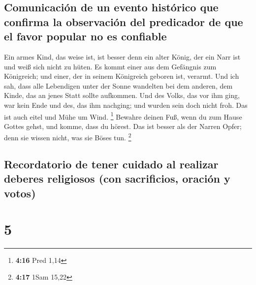 \hypertarget{comunicaciuxf3n-de-un-evento-histuxf3rico-que-confirma-la-observaciuxf3n-del-predicador-de-que-el-favor-popular-no-es-confiable}{%
\subsection{Comunicación de un evento histórico que confirma la
observación del predicador de que el favor popular no es
confiable}\label{comunicaciuxf3n-de-un-evento-histuxf3rico-que-confirma-la-observaciuxf3n-del-predicador-de-que-el-favor-popular-no-es-confiable}}

 Ein armes Kind, das weise ist, ist besser denn ein alter
König, der ein Narr ist und weiß sich nicht zu hüten.  Es
kommt einer aus dem Gefängnis zum Königreich; und einer, der in seinem
Königreich geboren ist, verarmt.  Und ich sah, dass alle
Lebendigen unter der Sonne wandelten bei dem anderen, dem Kinde, das an
jenes Statt sollte aufkommen.  Und des Volks, das vor ihm
ging, war kein Ende und des, das ihm nachging; und wurden sein doch
nicht froh. Das ist auch eitel und Mühe um Wind. \footnote{\textbf{4:16}
  Pred 1,14}  Bewahre deinen Fuß, wenn du zum Hause
Gottes gehst, und komme, dass du hörest. Das ist besser als der Narren
Opfer; denn sie wissen nicht, was sie Böses tun. \footnote{\textbf{4:17}
  1Sam 15,22}

\hypertarget{recordatorio-de-tener-cuidado-al-realizar-deberes-religiosos-con-sacrificios-oraciuxf3n-y-votos}{%
\subsection{Recordatorio de tener cuidado al realizar deberes religiosos
(con sacrificios, oración y
votos)}\label{recordatorio-de-tener-cuidado-al-realizar-deberes-religiosos-con-sacrificios-oraciuxf3n-y-votos}}

\hypertarget{section-4}{%
\section{5}\label{section-4}}

